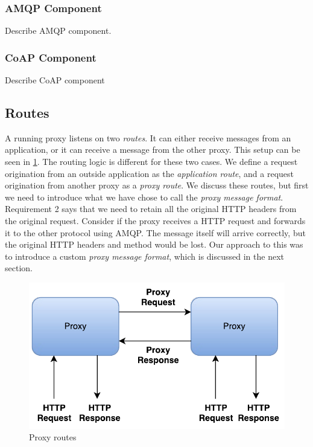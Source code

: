 \subsubsection{AMQP Component}

Describe AMQP component.

\subsubsection{CoAP Component}

Describe CoAP component

\subsection{Routes}

A running proxy listens on two \textit{routes}. It can either receive messages
from an application, or it can receive a message from the other proxy. This
setup can be seen in \cref{figure:dil-routes}. The routing logic is different
for these two cases. We define a request origination from an outside application
as the \textit{application route}, and a request origination from another proxy
as a \textit{proxy route}. We discuss these routes, but first we need to
introduce what we have chose to call the \textit{proxy message format}.
Requirement 2 says that we need to retain all the original HTTP headers from the
original request. Consider if the proxy receives a HTTP request and forwards it
to the other protocol using AMQP. The message itself will arrive correctly, but
the original HTTP headers and method would be lost. Our approach to this was to
introduce a custom \textit{proxy message format}, which is discussed in the next
section.

\begin{figure}[h]
\centering
\includegraphics[scale=0.7]{images/dil_routes.pdf}
\caption{Proxy routes}
\label{figure:dil-routes}
\end{figure}

